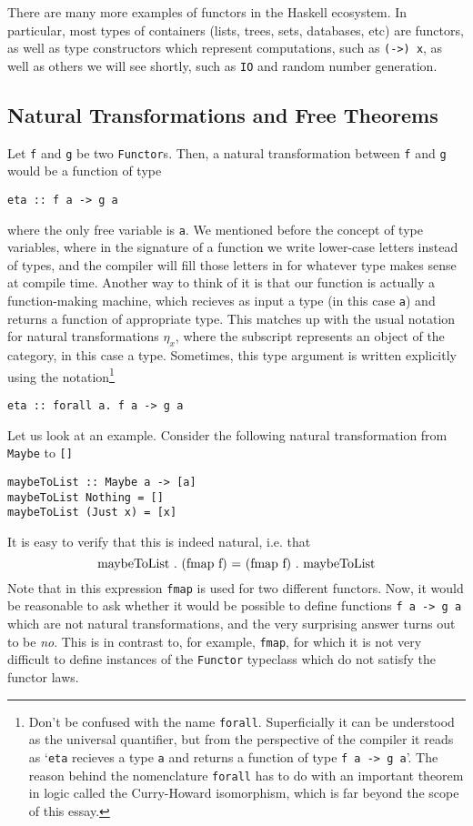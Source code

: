 \documentclass[11	pt]{article}
\theoremstyle{nonumberplain}
\newcommand*\lsin{\lstinline}
\newcommand*\lsmath[1]{\text{\lstinline|#1|}}
\begin{document}
There are many more examples of functors in the Haskell ecosystem. In particular, most types of containers (lists, trees, sets, databases, etc) are functors, as well as type constructors which represent computations, such as \lsin|(->) x|, as well as others we will see shortly, such as \lsin|IO| and random number generation.

\subsection{Natural Transformations and Free Theorems}

Let \lsin|f| and \lsin|g| be two \lsin|Functor|s. Then, a natural transformation between \lsin|f| and \lsin|g| would be a function of type
\begin{lstlisting}
eta :: f a -> g a
\end{lstlisting}
where the only free variable is \lsin|a|. We mentioned before the concept of type variables, where in the signature of a function we write lower-case letters instead of types, and the compiler will fill those letters in for whatever type makes sense at compile time. Another way to think of it is that our function is actually a function-making machine, which recieves as input a type (in this case \lsin|a|) and returns a function of appropriate type. This matches up with the usual notation for natural transformations $\eta_x$, where the subscript represents an object of the category, in this case a type. Sometimes, this type argument is written explicitly using the notation\footnote{Don't be confused with the name \lsin|forall|. Superficially it can be understood as the universal quantifier, but from the perspective of the compiler it reads as `\lsin|eta| recieves a type \lsin|a| and returns a function of type \lsin|f a -> g a|'. The reason behind the nomenclature \lsin|forall| has to do with an important theorem in logic called the Curry-Howard isomorphism, which is far beyond the scope of this essay.}
\begin{lstlisting}
eta :: forall a. f a -> g a
\end{lstlisting}

Let us look at an example. Consider the following natural transformation from \lsin|Maybe| to \lsin|[]|
\begin{lstlisting}
maybeToList :: Maybe a -> [a]
maybeToList Nothing = []
maybeToList (Just x) = [x]
\end{lstlisting}

It is easy to verify that this is indeed natural, i.e. that
\begin{equation}
\lsmath{maybeToList . (fmap f) = (fmap f) . maybeToList}
\end{equation}
Note that in this expression \lsin|fmap| is used for two different functors. Now, it would be reasonable to ask whether it would be possible to define functions \lsin|f a -> g a| which are not natural transformations, and the very surprising answer turns out to be \emph{no}. This is in contrast to, for example, \lsin|fmap|, for which it is not very difficult to define instances of the \lsin|Functor| typeclass which do not satisfy the functor laws.
\end{document}
